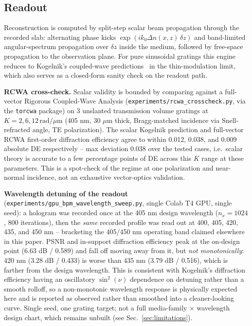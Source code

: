 \documentclass[conference]{IEEEtran}
\begin{document}
\subsection{Readout}
Reconstruction is computed by split-step scalar beam propagation through the
recorded slab: alternating phase kicks $\exp(ik_0\Delta n(x,z)\,\delta z)$ and
band-limited angular-spectrum propagation over $\delta z$ inside the medium,
followed by free-space propagation to the observation plane. For pure
sinusoidal gratings this engine reduces to Kogelnik's coupled-wave
predictions~\cite{kogelnik1969coupled} in the thin-modulation limit, which
also serves as a closed-form sanity check on the readout path.

\textbf{RCWA cross-check.} Scalar validity is bounded by comparing against a
full-vector Rigorous Coupled-Wave Analysis (\texttt{experiments/rcwa\_crosscheck.py},
via the \texttt{torcwa} package) on 3 unslanted transmission volume gratings
at $K = 2, 6, 12\,\mathrm{rad}/\mu\mathrm{m}$ (405 nm, 30 $\mu$m thick,
Bragg-matched incidence via Snell-refracted angle, TE polarization). The
scalar Kogelnik prediction and full-vector RCWA first-order diffraction
efficiency agree to within 0.012, 0.038, and 0.009 absolute DE respectively
-- max deviation 0.038 over the tested cases, i.e.\ scalar theory is accurate
to a few percentage points of DE across this $K$ range at these parameters.
This is a spot-check of the regime at one polarization and near-normal
incidence, not an exhaustive vector-optics validation.

\textbf{Wavelength detuning of the readout}
(\texttt{experiments/gpu\_bpm\_wavelength\_sweep.py}, single Colab T4 GPU,
single seed): a hologram was recorded once at the 405 nm design wavelength
($n_x{=}1024$, 800 iterations), then the \emph{same} recorded profile was
read out at 400, 405, 420, 435, and 450 nm -- bracketing the 405/450 nm
operating band claimed elsewhere in this paper. PSNR and in-support
diffraction efficiency peak at the on-design point (6.63 dB / 0.589) and
fall off moving away from it, but \emph{not monotonically}: 420 nm
(3.28 dB / 0.433) is worse than 435 nm (3.79 dB / 0.516), which is farther
from the design wavelength. This is consistent with Kogelnik's diffraction
efficiency having an oscillatory $\sin^2(\nu)$ dependence on detuning rather
than a smooth rolloff, so a non-monotonic wavelength response is physically
expected here and is reported as observed rather than smoothed into a
cleaner-looking curve. Single seed, one grating target; not a full
media-family $\times$ wavelength design chart, which remains unbuilt (see
Sec.~\ref{sec:limitations}).
\end{document}
